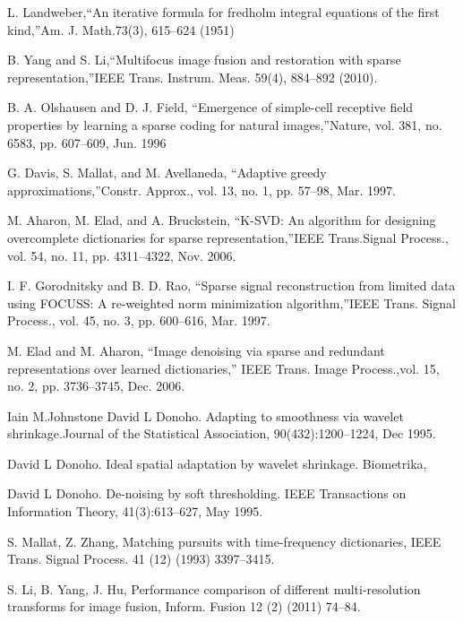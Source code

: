 \begin{thebibliography}{150}
 L. Landweber,“An iterative formula for fredholm integral equations of the first kind,”Am. J. Math.73(3), 615–624 (1951)

B. Yang and S. Li,“Multifocus image fusion and restoration with sparse representation,”IEEE Trans. Instrum. Meas. 59(4), 884–892 (2010).

B. A. Olshausen and D. J. Field, “Emergence of simple-cell receptive field properties by learning a sparse coding for natural images,”Nature, vol. 381, no. 6583, pp. 607–609, Jun. 1996

G. Davis, S. Mallat, and M. Avellaneda, “Adaptive greedy approximations,”Constr. Approx., vol. 13, no. 1, pp. 57–98, Mar. 1997.

 M. Aharon, M. Elad, and A. Bruckstein, “K-SVD: An algorithm for designing overcomplete dictionaries for sparse representation,”IEEE Trans.Signal Process., vol. 54, no. 11, pp. 4311–4322, Nov. 2006.

I. F. Gorodnitsky and B. D. Rao, “Sparse signal reconstruction from limited data using FOCUSS: A re-weighted norm minimization algorithm,”IEEE Trans. Signal Process., vol. 45, no. 3, pp. 600–616, Mar. 1997.

M. Elad and M. Aharon, “Image denoising via sparse and redundant representations over learned dictionaries,” IEEE Trans. Image Process.,vol. 15, no. 2, pp. 3736–3745, Dec. 2006.

Iain M.Johnstone David L Donoho. Adapting to smoothness via wavelet shrinkage.Journal of the Statistical Association, 90(432):1200–1224, Dec 1995.

 David L Donoho. Ideal spatial adaptation by wavelet shrinkage. Biometrika,

 David L Donoho. De-noising by soft thresholding. IEEE Transactions on Information Theory, 41(3):613–627, May 1995.

S. Mallat, Z. Zhang, Matching pursuits with time-frequency dictionaries, IEEE Trans. Signal Process. 41 (12) (1993) 3397–3415.

S. Li, B. Yang, J. Hu, Performance comparison of different multi-resolution transforms for image fusion, Inform. Fusion 12 (2) (2011) 74–84.

\end{thebibliography}
